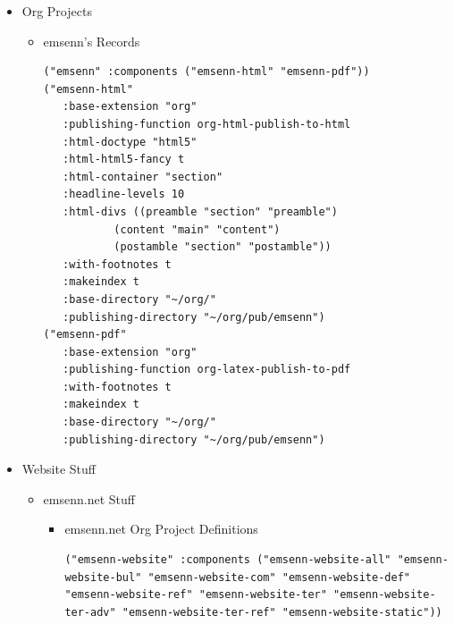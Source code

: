 \documentclass[11pt]{article}
\begin{document}
\begin{itemize}
\item Org Projects
\label{sec:org7a6680d}
\begin{itemize}
\item emsenn's Records
\label{sec:orgfa42355}
\begin{verbatim}
("emsenn" :components ("emsenn-html" "emsenn-pdf"))
("emsenn-html"
   :base-extension "org"
   :publishing-function org-html-publish-to-html
   :html-doctype "html5"
   :html-html5-fancy t
   :html-container "section"
   :headline-levels 10
   :html-divs ((preamble "section" "preamble")
	       (content "main" "content")
	       (postamble "section" "postamble"))
   :with-footnotes t
   :makeindex t
   :base-directory "~/org/"
   :publishing-directory "~/org/pub/emsenn")
("emsenn-pdf"
   :base-extension "org"
   :publishing-function org-latex-publish-to-pdf
   :with-footnotes t
   :makeindex t
   :base-directory "~/org/"
   :publishing-directory "~/org/pub/emsenn")
\end{verbatim}
\end{itemize}
\item Website Stuff
\label{sec:orgdce6730}
\begin{itemize}
\item emsenn.net Stuff
\label{sec:org63cf638}
\begin{itemize}
\item emsenn.net Org Project Definitions
\label{sec:orga12c58c}
\begin{verbatim}
("emsenn-website" :components ("emsenn-website-all" "emsenn-website-bul" "emsenn-website-com" "emsenn-website-def" "emsenn-website-ref" "emsenn-website-ter" "emsenn-website-ter-adv" "emsenn-website-ter-ref" "emsenn-website-static"))


\end{verbatim}
\end{itemize}
\end{itemize}
\end{itemize}
\end{document}

